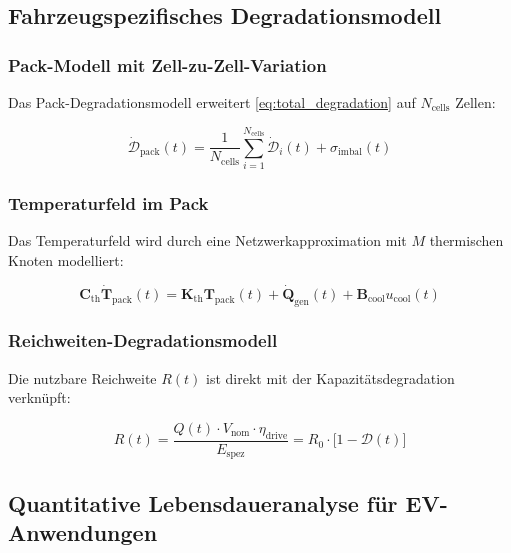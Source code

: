 ﻿\documentclass[12pt,a4paper]{article}
\begin{document}
	\subsection{Fahrzeugspezifisches Degradationsmodell}
	
	\subsubsection{Pack-Modell mit Zell-zu-Zell-Variation}
	
	Das Pack-Degradationsmodell erweitert \eqref{eq:total_degradation} auf
	$N_\mathrm{cells}$ Zellen:
	
	\begin{equation}
		\dot{\mathcal{D}}_\mathrm{pack}(t) = \frac{1}{N_\mathrm{cells}}
		\sum_{i=1}^{N_\mathrm{cells}} \dot{\mathcal{D}}_i(t)
		+ \sigma_\mathrm{imbal}(t)
		\label{eq:pack_degradation}
	\end{equation}
	
	\subsubsection{Temperaturfeld im Pack}
	
	Das Temperaturfeld wird durch eine Netzwerkapproximation mit $M$ thermischen
	Knoten modelliert:
	
	\begin{equation}
		\mathbf{C}_\mathrm{th} \dot{\mathbf{T}}_\mathrm{pack}(t) =
		\mathbf{K}_\mathrm{th} \mathbf{T}_\mathrm{pack}(t) + \dot{\mathbf{Q}}_\mathrm{gen}(t)
		+ \mathbf{B}_\mathrm{cool} u_\mathrm{cool}(t)
		\label{eq:thermal_network_ev}
	\end{equation}
	
	\subsubsection{Reichweiten-Degradationsmodell}
	
	Die nutzbare Reichweite $R(t)$ ist direkt mit der Kapazitätsdegradation
	verknüpft:
	
	\begin{equation}
		R(t) = \frac{Q(t) \cdot V_\mathrm{nom} \cdot \eta_\mathrm{drive}}{E_\mathrm{spez}}
		= R_0 \cdot \bigl[1 - \mathcal{D}(t)\bigr]
		\label{eq:range_model}
	\end{equation}
	
	\subsection{Quantitative Lebensdaueranalyse für EV-Anwendungen}
	
\end{document}
